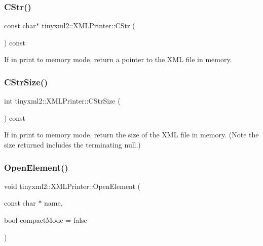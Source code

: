 \subsubsection{\texorpdfstring{C\+Str()}{CStr()}}
{\footnotesize\ttfamily const char$\ast$ tinyxml2\+::\+X\+M\+L\+Printer\+::\+C\+Str (\begin{DoxyParamCaption}{ }\end{DoxyParamCaption}) const\hspace{0.3cm}{\ttfamily [inline]}}

If in print to memory mode, return a pointer to the X\+ML file in memory. \mbox{\label{classtinyxml2_1_1_x_m_l_printer_a3256cf3523d4898b91abb18b924be04c}} 
\subsubsection{\texorpdfstring{C\+Str\+Size()}{CStrSize()}}
{\footnotesize\ttfamily int tinyxml2\+::\+X\+M\+L\+Printer\+::\+C\+Str\+Size (\begin{DoxyParamCaption}{ }\end{DoxyParamCaption}) const\hspace{0.3cm}{\ttfamily [inline]}}

If in print to memory mode, return the size of the X\+ML file in memory. (Note the size returned includes the terminating null.) \mbox{\label{classtinyxml2_1_1_x_m_l_printer_a20fb06c83bd13e5140d7dd13af06c010}} 
\subsubsection{\texorpdfstring{Open\+Element()}{OpenElement()}}
{\footnotesize\ttfamily void tinyxml2\+::\+X\+M\+L\+Printer\+::\+Open\+Element (\begin{DoxyParamCaption}\item[{const char $\ast$}]{name,  }\item[{bool}]{compact\+Mode = {\ttfamily false} }\end{DoxyParamCaption})}


